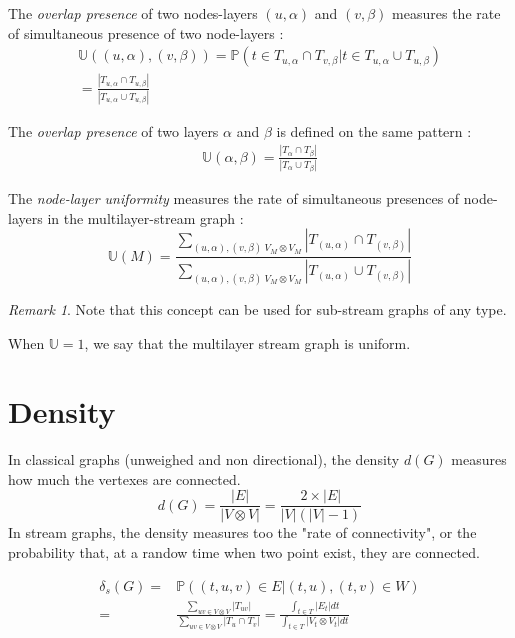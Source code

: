 \documentclass[dvipsnames,a4paper,11pt]{article}
\theoremstyle{definition}
\theoremstyle{remark}
\newtheorem{rmq}{Remark}
\theoremstyle{remark}
\begin{document}
	The {\em overlap presence } of two nodes-layers $(u,\alpha)$ and $(v,\beta)$ measures the rate of simultaneous presence of two node-layers :
	\begin{align*}
		\mathbb{U}((u,\alpha),(v,\beta))=\mathbb{P}( t \in T_{u,\alpha} \cap T_{v,\beta} | t \in T_{u,\alpha} \cup T_{u,\beta}) \\
		= \frac{|T_{u,\alpha}\cap T_{u,\beta}|}{|T_{u,\alpha}\cup T_{u,\beta}|}
	\end{align*}

	The {\em overlap presence} of two layers $\alpha$ and $\beta$ is defined on the same pattern :
	\begin{align*}
		\mathbb{U}(\alpha,\beta) = \frac{|T_{\alpha}\cap T_{\beta}|}{|T_{\alpha}\cup T_{\beta}|}
	\end{align*}

    The {\em node-layer uniformity} measures the rate of simultaneous presences of node-layers in the multilayer-stream graph :
    \[
    	\mathbb{U}(M) = \frac{\sum_{(u,\alpha),(v,\beta) \ V_M \otimes V_M}{|T_{(u,\alpha)} \cap T_{(v,\beta)}|}}{\sum_{(u,\alpha),(v,\beta) \ V_M \otimes V_M}{|T_{(u,\alpha)}\cup T_{(v,\beta)}|}}
    \]



	\begin{rmq}
		Note that this concept can be used for sub-stream graphs of any type.
	\end{rmq}

	When $\mathbb{U}=1$, we say that the multilayer stream graph is uniform.



    \section{Density}
	In classical graphs (unweighed and non directional), the density $d(G)$ measures how much the vertexes are connected.
		\[
			d(G) = \frac{|E|}{|V\otimes V|} = \frac{2\times |E|}{|V|(|V|-1)}
		\]
	In stream graphs, the density measures too the "rate of connectivity", or the probability that, at a randow time when two point exist, they are connected.

		\begin{align*}
			\delta_s(G) = & \mathbb{P}((t,u,v)\in E| (t,u),(t,v) \in W) \\
			 =  & \frac{\sum_{uv \in V \otimes V}{|T_{uv}|}}{\sum_{uv \in V\otimes V}{|T_u\cap T_v|}}= \frac{\int_{t\in T}{|E_t|dt}}{\int_{t\in T}{|V_t\otimes V_t|dt}}
		\end{align*}
\end{document}
